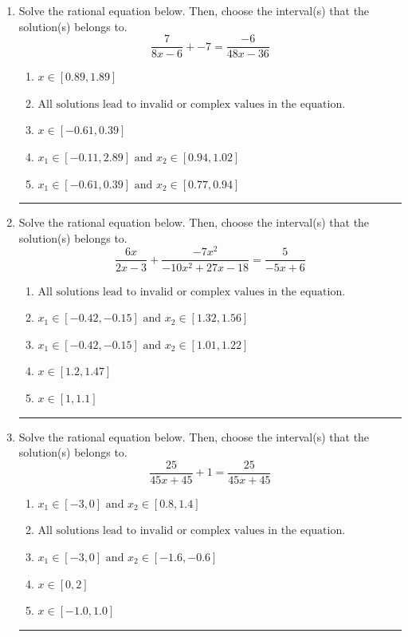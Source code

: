 \documentclass[14pt]{extbook}
\newcommand{\litem}[1]{\item#1\hspace*{-1cm}\rule{\textwidth}{0.4pt}}
\begin{document}
\begin{enumerate}
{\begin{enumerate}[label=\Alph*.]
\end{enumerate} }
\litem{
Solve the rational equation below. Then, choose the interval(s) that the solution(s) belongs to.\[ \frac{7}{8x -6} + -7 = \frac{-6}{48x -36} \]\begin{enumerate}[label=\Alph*.]
\item \( x \in [0.89,1.89] \)
\item \( \text{All solutions lead to invalid or complex values in the equation.} \)
\item \( x \in [-0.61,0.39] \)
\item \( x_1 \in [-0.11, 2.89] \text{ and } x_2 \in [0.94,1.02] \)
\item \( x_1 \in [-0.61, 0.39] \text{ and } x_2 \in [0.77,0.94] \)

\end{enumerate} }
\litem{
Solve the rational equation below. Then, choose the interval(s) that the solution(s) belongs to.\[ \frac{6x}{2x -3} + \frac{-7x^{2}}{-10x^{2} +27 x -18} = \frac{5}{-5x + 6} \]\begin{enumerate}[label=\Alph*.]
\item \( \text{All solutions lead to invalid or complex values in the equation.} \)
\item \( x_1 \in [-0.42, -0.15] \text{ and } x_2 \in [1.32,1.56] \)
\item \( x_1 \in [-0.42, -0.15] \text{ and } x_2 \in [1.01,1.22] \)
\item \( x \in [1.2,1.47] \)
\item \( x \in [1,1.1] \)

\end{enumerate} }
\litem{
Solve the rational equation below. Then, choose the interval(s) that the solution(s) belongs to.\[ \frac{25}{45x + 45} + 1 = \frac{25}{45x + 45} \]\begin{enumerate}[label=\Alph*.]
\item \( x_1 \in [-3, 0] \text{ and } x_2 \in [0.8,1.4] \)
\item \( \text{All solutions lead to invalid or complex values in the equation.} \)
\item \( x_1 \in [-3, 0] \text{ and } x_2 \in [-1.6,-0.6] \)
\item \( x \in [0,2] \)
\item \( x \in [-1.0,1.0] \)

\end{enumerate} }
\end{enumerate}
\end{document}
